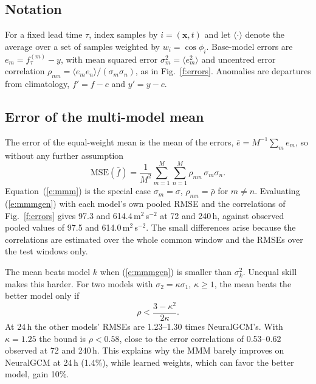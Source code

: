 \documentclass[twocol]{ametsocV6.1}
\newcommand{\units}{m$^{2}$\,s$^{-2}$}
\begin{document}
\appendix[C]

\subsection{Notation}

For a fixed lead time $\tau$, index samples by $i=(\mathbf{x},t)$ and let $\langle\cdot\rangle$ denote the average over a set of samples weighted by $w_i=\cos\phi_i$. Base-model errors are $e_m=f^{(m)}_\tau-y$, with mean squared error $\sigma_m^2=\langle e_m^2\rangle$ and uncentred error correlation $\rho_{mn}=\langle e_m e_n\rangle/(\sigma_m\sigma_n)$, as in Fig.~\ref{f:errors}. Anomalies are departures from climatology, $f'=f-c$ and $y'=y-c$.

\subsection{Error of the multi-model mean}

The error of the equal-weight mean is the mean of the errors, $\bar e=M^{-1}\sum_m e_m$, so without any further assumption
\begin{equation}
\mathrm{MSE}(\bar f)=\frac{1}{M^2}\sum_{m=1}^{M}\sum_{n=1}^{M}\rho_{mn}\,\sigma_m\sigma_n. \label{e:mmmgen}
\end{equation}
Equation~(\ref{e:mmm}) is the special case $\sigma_m=\sigma$, $\rho_{mn}=\bar\rho$ for $m\neq n$. Evaluating (\ref{e:mmmgen}) with each model's own pooled RMSE and the correlations of Fig.~\ref{f:errors} gives 97.3 and 614.4\,\units{} at 72 and 240\,h, against observed pooled values of 97.5 and 614.0\,\units. The small differences arise because the correlations are estimated over the whole common window and the RMSEs over the test windows only.

The mean beats model $k$ when (\ref{e:mmmgen}) is smaller than $\sigma_k^2$. Unequal skill makes this harder. For two models with $\sigma_2=\kappa\sigma_1$, $\kappa\ge1$, the mean beats the better model only if
\begin{equation}
\rho<\frac{3-\kappa^2}{2\kappa}. \label{e:twomodel}
\end{equation}
At 24\,h the other models' RMSEs are 1.23--1.30 times NeuralGCM's. With $\kappa=1.25$ the bound is $\rho<0.58$, close to the error correlations of 0.53--0.62 observed at 72 and 240\,h. This explains why the MMM barely improves on NeuralGCM at 24\,h (1.4\%), while learned weights, which can favor the better model, gain 10\%.
\end{document}
